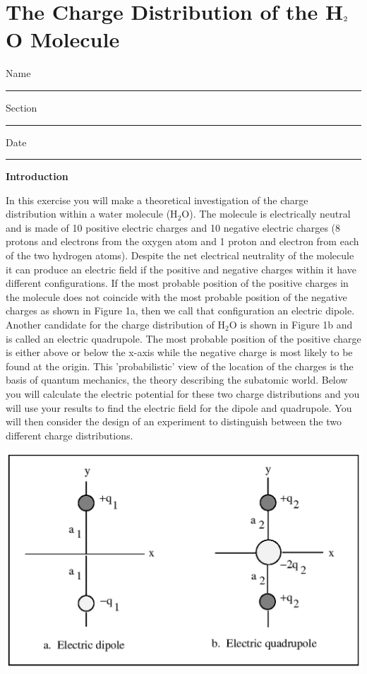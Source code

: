 
\section{The Charge Distribution of the H\protect\( _{2}\protect \)O Molecule}

Name \rule{2.0in}{0.1pt}\hfill{}Section \rule{1.0in}{0.1pt}\hfill{}Date
\rule{1.0in}{0.1pt}

\textbf{Introduction}

In this exercise you will make a theoretical investigation of the
charge distribution within a water molecule (H\( _{2} \)O). The molecule
is electrically neutral and is made of 10 positive electric charges
and 10 negative electric charges (8 protons and electrons from the
oxygen atom and 1 proton and electron from each of the two hydrogen
atoms). Despite the net electrical neutrality of the molecule it can
produce an electric field if the positive and negative charges within
it have different configurations. If the most probable position of
the positive charges in the molecule does not coincide with the most
probable position of the negative charges as shown in Figure 1a, then
we call that configuration an electric dipole. Another candidate for
the charge distribution of H\( _{2} \)O is shown in Figure 1b and
is called an electric quadrupole. The most probable position of the
positive charge is either above or below the x-axis while the negative
charge is most likely to be found at the origin. This 'probabilistic'
view of the location of the charges is the basis of quantum mechanics,
the theory describing the subatomic world. Below you will calculate
the electric potential for these two charge distributions and you
will use your results to find the electric field for the dipole and
quadrupole. You will then consider the design of an experiment to
distinguish between the two different charge distributions.

\vspace{0.3cm}
{\centering \includegraphics{charge_dist_water_mol/charge_dist_water_mol_fig_1.eps} \par}
\vspace{0.3cm}

